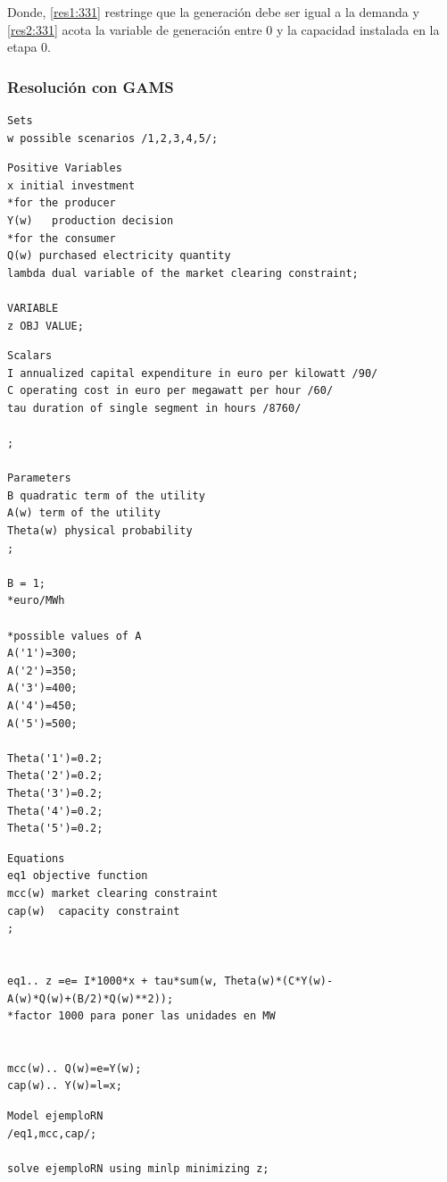 Donde, \ref{res1:331} restringe que la generación debe ser igual a la demanda y \ref{res2:331} acota la variable de generación entre 0 y la capacidad instalada en la etapa 0.

\subsubsection{Resolución con GAMS}
\begin{footnotesize}

\begin{lstlisting}
Sets
w possible scenarios /1,2,3,4,5/;
\end{lstlisting}

\begin{lstlisting}
Positive Variables
x initial investment
*for the producer
Y(w)   production decision
*for the consumer
Q(w) purchased electricity quantity
lambda dual variable of the market clearing constraint;

VARIABLE
z OBJ VALUE;   
\end{lstlisting}

\begin{lstlisting}
Scalars
I annualized capital expenditure in euro per kilowatt /90/
C operating cost in euro per megawatt per hour /60/
tau duration of single segment in hours /8760/

;

Parameters
B quadratic term of the utility
A(w) term of the utility
Theta(w) physical probability
;

B = 1;
*euro/MWh 

*possible values of A
A('1')=300;
A('2')=350;
A('3')=400;
A('4')=450;
A('5')=500;

Theta('1')=0.2;
Theta('2')=0.2;
Theta('3')=0.2;
Theta('4')=0.2;
Theta('5')=0.2;
\end{lstlisting}

\begin{lstlisting}
Equations
eq1 objective function
mcc(w) market clearing constraint
cap(w)  capacity constraint
;


eq1.. z =e= I*1000*x + tau*sum(w, Theta(w)*(C*Y(w)-
A(w)*Q(w)+(B/2)*Q(w)**2));
*factor 1000 para poner las unidades en MW


mcc(w).. Q(w)=e=Y(w);
cap(w).. Y(w)=l=x;   
\end{lstlisting}

\begin{lstlisting}
Model ejemploRN
/eq1,mcc,cap/;

solve ejemploRN using minlp minimizing z;    
\end{lstlisting}
\end{footnotesize}

